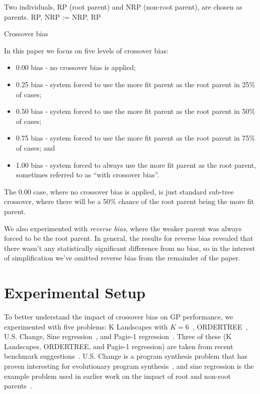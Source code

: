 \documentclass{sig-alternate}
\begin{document}
\begin{algorithm}[tb]
\begin{algorithmic}
\Require Two individuals, RP (root parent) and NRP (non-root parent), are chosen as parents.
 
        \State RP, NRP := NRP, RP  
    \EndIf
\EndIf
\end{algorithmic}
\caption{Crossover bias}
\label{alg:biasAlgorithm}
\end{algorithm}

In this paper we focus on five levels of crossover bias:
\begin{itemize}
\item 0.00 bias - no crossover bias is applied;
\item 0.25 bias - system forced to use the more fit parent as the root parent in 25\% of cases;
\item 0.50 bias - system forced to use the more fit parent as the root parent in 50\% of cases;
\item 0.75 bias - system forced to use the more fit parent as the root parent in 75\% of cases; and
\item 1.00 bias - system forced to always use the more fit parent as the root parent, sometimes referred to as ``with crossover bias''.
\end{itemize}
The 0.00 case, where no crossover bias is applied, is just standard sub-tree crossover, where there will be a 50\% chance of the root parent being the more fit parent.

We also experimented with \emph{reverse bias}, where the weaker parent was always forced to be 
the root parent. In general, the results for reverse bias revealed that there wasn't any statistically significant difference from 
no bias, so in the 
interest of simplification we've omitted reverse bias from the remainder of the paper.

\section{Experimental Setup} \label{sec:Experiments}

To better understand the impact of crossover bias on GP performance, we 
experimented with five problems: K Landscapes with $K=6$~\cite{vanneschi2011k}, 
ORDER\-TREE~\cite{hoang2006ordertree}, U.S. Change, Sine regression~\cite{poli08:fieldguide}, 
and Pagie-1 regression~\cite{pagie1997evolutionary}.
Three of these (K Landscapes, ORDERTREE, and Pagie-1 regression) are taken from recent benchmark 
suggestions~\cite{gp-benchmarks-2013}. U.S. Change is a program synthesis problem  that has proven 
interesting for evolutionary program synthesis~\cite{zhan2014quantitative}, and sine regression 
is the example problem used in earlier work on the impact of root and non-root 
parents~\cite{McPheeDonatucciDramdahl:2014}.
\end{document}
